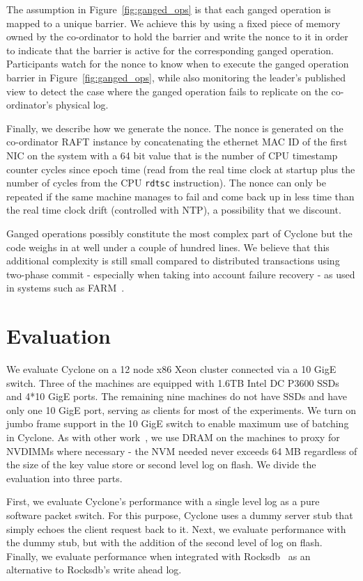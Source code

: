 \documentclass[twocolumn]{article}
\begin{document}
The assumption in Figure~\ref{fig:ganged_ops} is that each ganged operation is
mapped to a unique barrier. We achieve this by using a fixed piece of memory
owned by the co-ordinator to hold the barrier and write the nonce to it in order
to indicate that the barrier is active for the corresponding ganged
operation. Participants watch for the nonce to know when to execute the
ganged operation barrier in Figure~\ref{fig:ganged_ops}, while also monitoring
the leader's published view to detect the case where the ganged operation fails
to replicate on the co-ordinator's physical log.

Finally, we describe how we generate the nonce. The nonce is generated on the
co-ordinator RAFT instance by concatenating the ethernet MAC ID of the first NIC
on the system with a 64 bit value that is the number of CPU timestamp counter
cycles since epoch time (read from the real time clock at startup plus the
number of cycles from the CPU {\tt rdtsc} instruction). The nonce can only be
repeated if the same machine manages to fail and come back up in less time than
the real time clock drift (controlled with NTP), a possibility that we discount.

Ganged operations possibly constitute the most complex part of Cyclone but the
code weighs in at well under a couple of hundred lines. We believe that
this additional complexity is still small compared to distributed transactions
using two-phase commit - especially when taking into account failure recovery -
as used in systems such as FARM~\cite{farm}.

\section{Evaluation}
\label{sec:evaluation}
We evaluate Cyclone on a 12 node x86 Xeon cluster connected via a 10 GigE
switch. Three of the machines are equipped with 1.6TB Intel DC P3600 SSDs and
4*10 GigE ports. The remaining nine machines do not have SSDs and have only one
10 GigE port, serving as clients for most of the experiments. We turn on jumbo
frame support in the 10 GigE switch to enable maximum use of batching in
Cyclone. As with other work~\cite{faast}, we use DRAM on the machines to proxy
for NVDIMMs where necessary - the NVM needed never exceeds 64 MB
regardless of the size of the key value store or second level log on flash. We
divide the evaluation into three parts.

First, we evaluate Cyclone's performance with a single level log as a pure
software packet switch. For this purpose, Cyclone uses a dummy server stub that
simply echoes the client request back to it. Next, we evaluate
performance with the dummy stub, but with the addition of the second level of log
on flash. Finally, we evaluate performance when integrated with
Rocksdb~\cite{rocksdb} as an alternative to Rocksdb's write ahead log.
\end{document}
